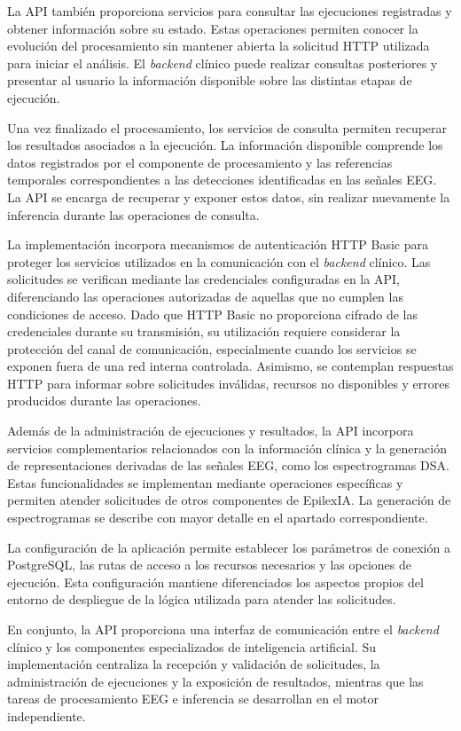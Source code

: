 La API también proporciona servicios para
consultar las ejecuciones registradas y
obtener información sobre su estado. Estas
operaciones permiten conocer la evolución
del procesamiento sin mantener abierta
la solicitud HTTP utilizada para iniciar
el análisis. El \textit{backend} clínico puede
realizar consultas posteriores y presentar
al usuario la información disponible sobre
las distintas etapas de ejecución.

Una vez finalizado el procesamiento, los
servicios de consulta permiten recuperar
los resultados asociados a la ejecución.
La información disponible comprende los
datos registrados por el componente de
procesamiento y las referencias temporales
correspondientes a las detecciones
identificadas en las señales EEG. La API
se encarga de recuperar y exponer estos
datos, sin realizar nuevamente la inferencia
durante las operaciones de consulta.


La implementación incorpora mecanismos de autenticación
HTTP Basic para proteger los servicios utilizados en la
comunicación con el \textit{backend} clínico. Las solicitudes se
verifican mediante las credenciales configuradas en la API,
diferenciando las operaciones autorizadas de aquellas que
no cumplen las condiciones de acceso. Dado que HTTP Basic
no proporciona cifrado de las credenciales durante su
transmisión, su utilización requiere considerar la
protección del canal de comunicación, especialmente
cuando los servicios se exponen fuera de una red interna
controlada. Asimismo, se contemplan respuestas HTTP
para informar sobre solicitudes inválidas, recursos no
disponibles y errores producidos durante las operaciones.


Además de la administración de ejecuciones
y resultados, la API incorpora servicios
complementarios relacionados con la
información clínica y la generación de
representaciones derivadas de las señales
EEG, como los espectrogramas DSA. Estas
funcionalidades se implementan mediante
operaciones específicas y permiten atender
solicitudes de otros componentes de EpilexIA.
La generación de espectrogramas se describe
con mayor detalle en el apartado correspondiente.

La configuración de la aplicación permite
establecer los parámetros de conexión a
PostgreSQL, las rutas de acceso a los recursos
necesarios y las opciones de ejecución. Esta configuración
mantiene diferenciados los aspectos propios
del entorno de despliegue de la lógica
utilizada para atender las solicitudes.

En conjunto, la API proporciona una interfaz
de comunicación entre el \textit{backend} clínico
y los componentes especializados de
inteligencia artificial. Su implementación
centraliza la recepción y validación de
solicitudes, la administración de ejecuciones
y la exposición de resultados, mientras
que las tareas de procesamiento EEG e
inferencia se desarrollan en el motor independiente.


